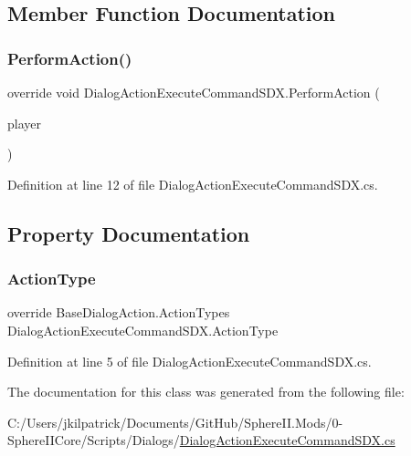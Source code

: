 \subsection{Member Function Documentation}
\mbox{\label{class_dialog_action_execute_command_s_d_x_a97c8e46376e72ed90822f68886dd52ba}} 
\subsubsection{\texorpdfstring{PerformAction()}{PerformAction()}}
{\footnotesize\ttfamily override void Dialog\+Action\+Execute\+Command\+S\+D\+X.\+Perform\+Action (\begin{DoxyParamCaption}\item[{Entity\+Player}]{player }\end{DoxyParamCaption})}



Definition at line 12 of file Dialog\+Action\+Execute\+Command\+S\+D\+X.\+cs.



\subsection{Property Documentation}
\mbox{\label{class_dialog_action_execute_command_s_d_x_ad7651451453eaace529347a8f1a61213}} 
\subsubsection{\texorpdfstring{ActionType}{ActionType}}
{\footnotesize\ttfamily override Base\+Dialog\+Action.\+Action\+Types Dialog\+Action\+Execute\+Command\+S\+D\+X.\+Action\+Type\hspace{0.3cm}{\ttfamily [get]}}



Definition at line 5 of file Dialog\+Action\+Execute\+Command\+S\+D\+X.\+cs.



The documentation for this class was generated from the following file\+:\begin{DoxyCompactItemize}
\item 
C\+:/\+Users/jkilpatrick/\+Documents/\+Git\+Hub/\+Sphere\+I\+I.\+Mods/0-\/\+Sphere\+I\+I\+Core/\+Scripts/\+Dialogs/\mbox{\hyperlink{_dialog_action_execute_command_s_d_x_8cs}{Dialog\+Action\+Execute\+Command\+S\+D\+X.\+cs}}\end{DoxyCompactItemize}
